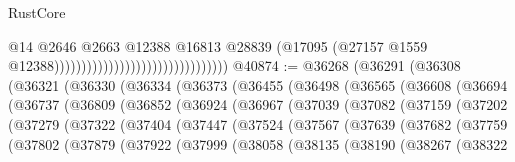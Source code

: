 \begin{lexlean}{RustCore}
\begin{coremodule}
                                                                @14
                                                                @2646
                                                                @2663
                                                                @12388
                                                                @16813
                                                                @28839
                                                                (@17095
                                                                  (@27157
                                                                    @1559
                                                                    @12388))))))))))))))))))))))))))))))))
@40874 := @36268
    (@36291
      (@36308
        (@36321
          (@36330
            (@36334
              (@36373
                (@36455
                  (@36498
                    (@36565
                      (@36608
                        (@36694
                          (@36737
                            (@36809
                              (@36852
                                (@36924
                                  (@36967
                                    (@37039
                                      (@37082
                                        (@37159
                                          (@37202
                                            (@37279
                                              (@37322
                                                (@37404
                                                  (@37447
                                                    (@37524
                                                      (@37567
                                                        (@37639
                                                          (@37682
                                                            (@37759
                                                              (@37802
                                                                (@37879
                                                                  (@37922
                                                                    (@37999
                                                                      (@38058
                                                                        (@38135
                                                                          (@38190
                                                                            (@38267
                                                                              (@38322

\end{coremodule}
\end{lexlean}
